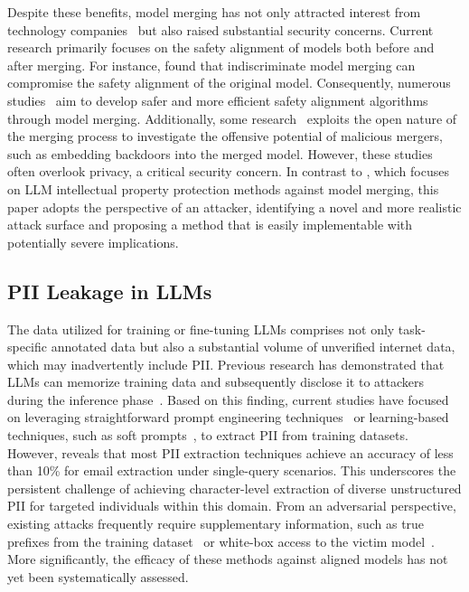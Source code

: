 Despite these benefits, model merging has not only attracted interest from technology companies~\citep{wortsman2022model, ilharcoediting} but also raised substantial security concerns. Current research primarily focuses on the safety alignment of models both before and after merging. For instance, \citet{hammoud2024model} found that indiscriminate model merging can compromise the safety alignment of the original model. Consequently, numerous studies~\citep{zheng2024weak, lin2024dogerm, lu2024online} aim to develop safer and more efficient safety alignment algorithms through model merging. Additionally, some research~\citep{zhang2024badmerging, yin2024lobam} exploits the open nature of the merging process to investigate the offensive potential of malicious mergers, such as embedding backdoors into the merged model. However, these studies often overlook privacy, a critical security concern. In contrast to \citet{cong2023have}, which focuses on LLM intellectual property protection methods against model merging, this paper adopts the perspective of an attacker, identifying a novel and more realistic attack surface and proposing a method that is easily implementable with potentially severe implications.


\subsection{PII Leakage in LLMs}

The data utilized for training or fine-tuning LLMs comprises not only task-specific annotated data but also a substantial volume of unverified internet data, which may inadvertently include PII. Previous research has demonstrated that LLMs can memorize training data and subsequently disclose it to attackers during the inference phase~\citep{nasr2023scalable, carliniquantifying, carlini2021extracting, tirumala2022memorization}. Based on this finding, current studies have focused on leveraging straightforward prompt engineering techniques~\citep{huang2022large, nakka2024pii} or learning-based techniques, such as soft prompts~\citep{kim2024propile, yang2024sos}, to extract PII from training datasets. However, \citet{nakka2024pii} reveals that most PII extraction techniques achieve an accuracy of less than 10\% for email extraction under single-query scenarios. This underscores the persistent challenge of achieving character-level extraction of diverse unstructured PII for targeted individuals within this domain. From an adversarial perspective, existing attacks frequently require supplementary information, such as true prefixes from the training dataset~\citep{carlini2021extracting, carliniquantifying} or white-box access to the victim model~\citep{kim2024propile, yang2024sos}. More significantly, the efficacy of these methods against aligned models has not yet been systematically assessed.
